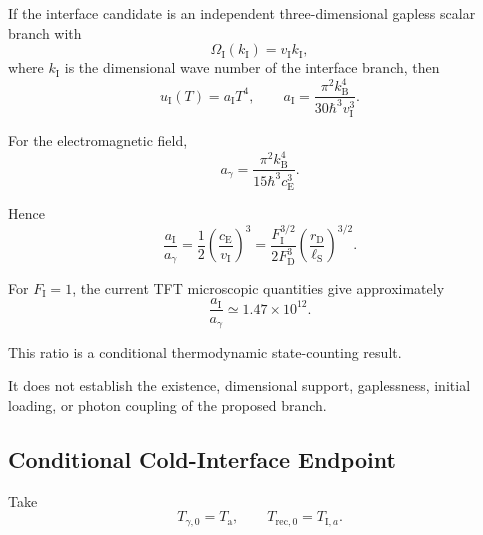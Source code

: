 If the interface candidate is an independent three-dimensional gapless scalar
branch with
\begin{equation}
    \Omega_{\mathrm I}(k_{\mathrm I})
    =
    v_{\mathrm I}k_{\mathrm I},
    \label{eq:AT_interface_gapless_dispersion}
\end{equation}
where \(k_{\mathrm I}\) is the dimensional wave number of the interface
branch, then
\begin{equation}
    u_{\mathrm I}(T)
    =
    a_{\mathrm I}T^4,
    \qquad
    a_{\mathrm I}
    =
    \frac{
        \pi^2k_{\mathrm B}^4
    }{
        30\hbar^3v_{\mathrm I}^3
    }.
    \label{eq:AT_interface_thermal_energy}
\end{equation}

For the electromagnetic field,
\begin{equation}
    a_\gamma
    =
    \frac{
        \pi^2k_{\mathrm B}^4
    }{
        15\hbar^3c_{\mathrm E}^3
    }.
\end{equation}

Hence
\begin{equation}
    \frac{a_{\mathrm I}}{a_\gamma}
    =
    \frac{1}{2}
    \left(
        \frac{
            c_{\mathrm E}
        }{
            v_{\mathrm I}
        }
    \right)^3
    =
    \frac{
        F_{\mathrm I}^{3/2}
    }{
        2F_{\mathrm D}^3
    }
    \left(
        \frac{
            r_{\mathrm D}
        }{
            \ell_{\mathrm S}
        }
    \right)^{3/2}.
    \label{eq:AT_interface_heat_capacity_ratio}
\end{equation}

For
\(F_{\mathrm I}=1\),
the current TFT microscopic quantities give approximately
\begin{equation}
    \frac{a_{\mathrm I}}{a_\gamma}
    \simeq
    1.47\times10^{12}.
    \label{eq:AT_interface_heat_capacity_ratio_numeric}
\end{equation}

This ratio is a conditional thermodynamic state-counting result.

It does not establish the existence, dimensional support, gaplessness,
initial loading, or photon coupling of the proposed branch.


\subsection{Conditional Cold-Interface Endpoint}

Take
\begin{equation}
    T_{\gamma,0}
    =
    T_{\mathrm a},
    \qquad
    T_{\mathrm{rec},0}
    =
    T_{\mathrm I,a}.
\end{equation}

